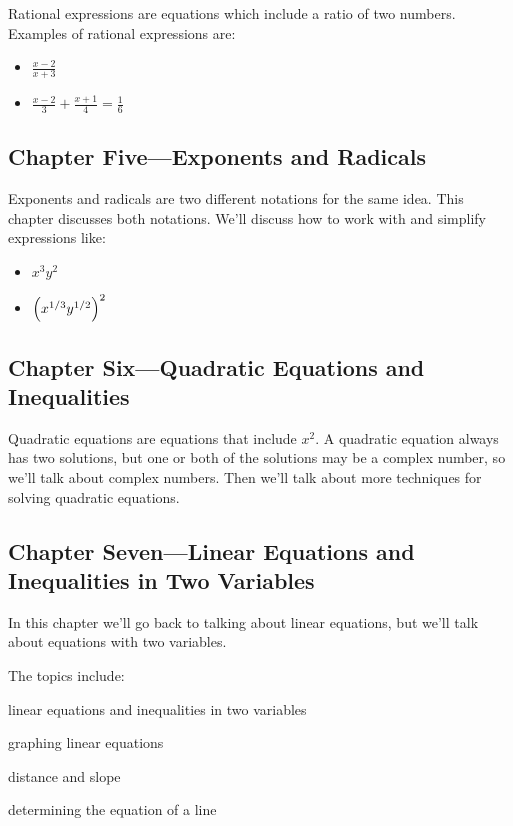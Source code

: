 \documentclass[letterpaper, landscape]{exam}
\begin{document}
    Rational expressions are equations which include a ratio of two numbers.  Examples of rational
    expressions are:

    \begin{itemize}
        \item $\frac{x - 2}{x + 3}$
        \item $\frac{x - 2}{3} + \frac{x + 1}{4} = \frac{1}{6}$
    \end{itemize}

    \subsection{Chapter Five---Exponents and Radicals}

    Exponents and radicals are two different notations for the same idea.  This chapter discusses
    both notations.  We'll discuss how to work with and simplify expressions like:

    \begin{itemize}
        \item $x^3y^2$
        \item $\del{ x^{1/3} y^{1/2} }^2$
    \end{itemize}

    \subsection{Chapter Six---Quadratic Equations and Inequalities}

    Quadratic equations are equations that include $x^2$.  A quadratic equation always has two
    solutions, but one or both of the solutions may be a complex number, so we'll talk about complex
    numbers.  Then we'll talk about more techniques for solving quadratic equations.

    \subsection{Chapter Seven---Linear Equations and Inequalities in Two Variables}

    In this chapter we'll go back to talking about linear equations, but we'll talk about equations
    with two variables.  
    
    The topics include:
    \begin{itemize*}
        \item linear equations and inequalities in two variables
        \item graphing linear equations
        \item distance and slope
        \item determining the equation of a line
    \end{itemize*}
\end{document}
